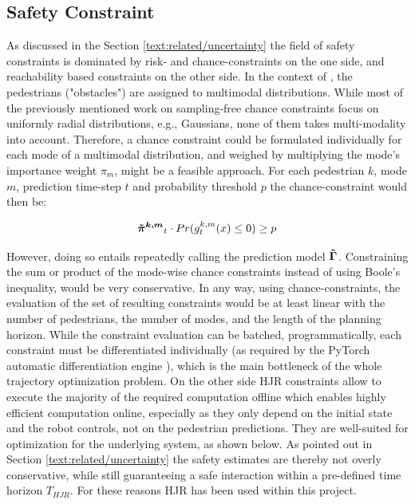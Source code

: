 \subsection{Safety Constraint}
\label{text:approach/constraint/safety}
As discussed in the Section \ref{text:related/uncertainty} the field of safety constraints is dominated by risk- and chance-constraints on the one side, and reachability based constraints on the other side.
\newline
In the context of \project, the pedestrians ("obstacles") are assigned to multimodal distributions. While most of the previously mentioned work on sampling-free chance constraints focus on uniformly radial distributions, e.g., Gaussians, none of them takes multi-modality into account. Therefore, a chance constraint could be formulated individually for each mode of a multimodal distribution, and weighed by multiplying the mode's importance weight $\pi_m$, might be a feasible approach. For each pedestrian $k$, mode $m$, prediction time-step $t$ and probability threshold $p$ the chance-constraint would then be:

\begin{equation}
\piped[k,m]_t \cdot Pr(g_t^{k,m}(x)\leq 0) \geq p
\end{equation}

However, doing so entails repeatedly calling the prediction model $\distmodel[]$. Constraining the sum or product of the mode-wise chance constraints instead of using Boole's inequality, would be very conservative. In any way, using chance-constraints, the evaluation of the set of resulting constraints would be at least linear with the number of pedestrians, the number of modes, and the length of the planning horizon. While the constraint evaluation can be batched, programmatically, each constraint must be differentiated individually (as required by the PyTorch automatic differentiation engine \cite{pytorch}), which is the main bottleneck of the whole trajectory optimization problem.
\newline
On the other side \ac{HJR} constraints allow to execute the majority of the required computation offline which enables highly efficient computation online, especially as they only depend on the initial state and the robot controls, not on the pedestrian predictions. They are well-suited for optimization for the underlying system, as shown below. As pointed out in Section \ref{text:related/uncertainty} the safety estimates are thereby not overly conservative, while still guaranteeing a safe interaction within a pre-defined time horizon $T_{HJR}$. For these reasons \ac{HJR} has been used within this project.

